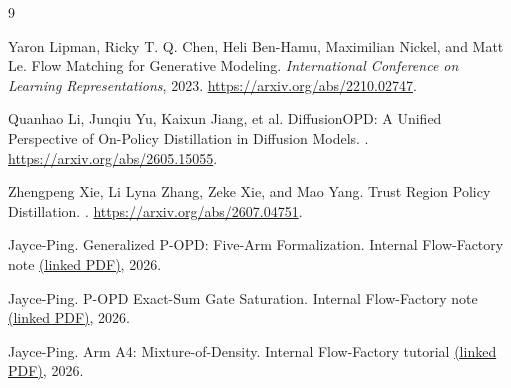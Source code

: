 \documentclass[11pt,a4paper]{article}
\theoremstyle{plain}
\theoremstyle{definition}
\begin{document}
\begin{thebibliography}{9}

Yaron Lipman, Ricky T. Q. Chen, Heli Ben-Hamu, Maximilian Nickel, and Matt Le.
\newblock Flow Matching for Generative Modeling.
\newblock \emph{International Conference on Learning Representations}, 2023.
\newblock \url{https://arxiv.org/abs/2210.02747}.

Quanhao Li, Junqiu Yu, Kaixun Jiang, et al.
\newblock DiffusionOPD: A Unified Perspective of On-Policy Distillation in Diffusion Models.
.
\newblock \url{https://arxiv.org/abs/2605.15055}.

Zhengpeng Xie, Li Lyna Zhang, Zeke Xie, and Mao Yang.
\newblock Trust Region Policy Distillation.
.
\newblock \url{https://arxiv.org/abs/2607.04751}.

Jayce-Ping.
\newblock Generalized P-OPD: Five-Arm Formalization.
\newblock Internal Flow-Factory note
\href{run:../arms/generalized_popd_five_arm_formalization.pdf}
{(linked PDF)}, 2026.

Jayce-Ping.
\newblock P-OPD Exact-Sum Gate Saturation.
\newblock Internal Flow-Factory note
\href{run:../p_opd/popd_exact_sum_gate_saturation.pdf}
{(linked PDF)}, 2026.

Jayce-Ping.
\newblock Arm A4: Mixture-of-Density.
\newblock Internal Flow-Factory tutorial
\href{run:../marginal_cfm/arm_a4_marginal_mixture_cfm_tutorial.pdf}
{(linked PDF)}, 2026.

\end{thebibliography}
\end{document}
